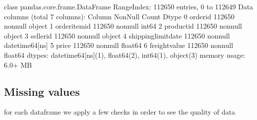 \documentclass[letterpaper,10pt,english]{jupyterBook}
\begin{document}
\begin{sphinxVerbatim}[commandchars=\\\{\}]
\PYG{p}{[}\PYG{p}{]} \PYG{p}{[}\PYG{p}{]}
\end{sphinxVerbatim}

\begin{sphinxVerbatim}[commandchars=\\\{\}]
\PYGZlt{}class \PYGZsq{}pandas.core.frame.DataFrame\PYGZsq{}\PYGZgt{}
RangeIndex: 112650 entries, 0 to 112649
Data columns (total 7 columns):
 \PYGZsh{}   Column               Non\PYGZhy{}Null Count   Dtype         
\PYGZhy{}\PYGZhy{}\PYGZhy{}  \PYGZhy{}\PYGZhy{}\PYGZhy{}\PYGZhy{}\PYGZhy{}\PYGZhy{}               \PYGZhy{}\PYGZhy{}\PYGZhy{}\PYGZhy{}\PYGZhy{}\PYGZhy{}\PYGZhy{}\PYGZhy{}\PYGZhy{}\PYGZhy{}\PYGZhy{}\PYGZhy{}\PYGZhy{}\PYGZhy{}   \PYGZhy{}\PYGZhy{}\PYGZhy{}\PYGZhy{}\PYGZhy{}         
 0   order\PYGZus{}id             112650 non\PYGZhy{}null  object        
 1   order\PYGZus{}item\PYGZus{}id        112650 non\PYGZhy{}null  int64         
 2   product\PYGZus{}id           112650 non\PYGZhy{}null  object        
 3   seller\PYGZus{}id            112650 non\PYGZhy{}null  object        
 4   shipping\PYGZus{}limit\PYGZus{}date  112650 non\PYGZhy{}null  datetime64[ns]
 5   price                112650 non\PYGZhy{}null  float64       
 6   freight\PYGZus{}value        112650 non\PYGZhy{}null  float64       
dtypes: datetime64[ns](1), float64(2), int64(1), object(3)
memory usage: 6.0+ MB
\end{sphinxVerbatim}


\subsection{Missing values}
\label{\detokenize{c7_case_studies/Olist:missing-values}}
\sphinxAtStartPar
for each dataframe we apply a few checks in order to see the quality of data

\begin{sphinxVerbatim}[commandchars=\\\{\}]
\end{sphinxVerbatim}
\end{document}
